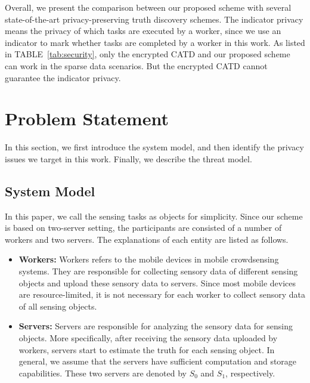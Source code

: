 \documentclass[conference]{IEEEtran}
\begin{document}
Overall, we present the comparison between our proposed scheme with several state-of-the-art privacy-preserving truth discovery schemes.
The indicator privacy means the privacy of which tasks are executed by a worker, since we use an indicator to mark whether tasks are completed by a worker in this work.
As listed in TABLE~\ref{tab:security}, only the encrypted CATD and our proposed scheme can work in the sparse data scenarios.
But the encrypted CATD cannot guarantee the indicator privacy.



\section{Problem Statement}\label{sec3}
In this section, we first introduce the system model, and then identify the privacy issues we target in this work.
Finally, we describe the threat model.

\subsection{System Model}\label{sec3-A}
In this paper, we call the sensing tasks as objects for simplicity.
Since our scheme is based on two-server setting, the participants are consisted of a number of workers and two servers.
The explanations of each entity are listed as follows.

\begin{itemize}
  \item \textbf{Workers:} Workers refers to the mobile devices in mobile crowdsensing systems. They are responsible for collecting sensory data of different sensing objects and upload these sensory data to servers. Since most mobile devices are resource-limited, it is not necessary for each worker to collect sensory data of all sensing objects.
  \item \textbf{Servers:} Servers are responsible for analyzing the sensory data for sensing objects. More specifically, after receiving the sensory data uploaded by workers, servers start to estimate the truth for each sensing object. In general, we assume that the servers have sufficient computation and storage capabilities. 
  These two servers are denoted by $S_0$ and $S_1$, respectively.
\end{itemize}
\end{document}
